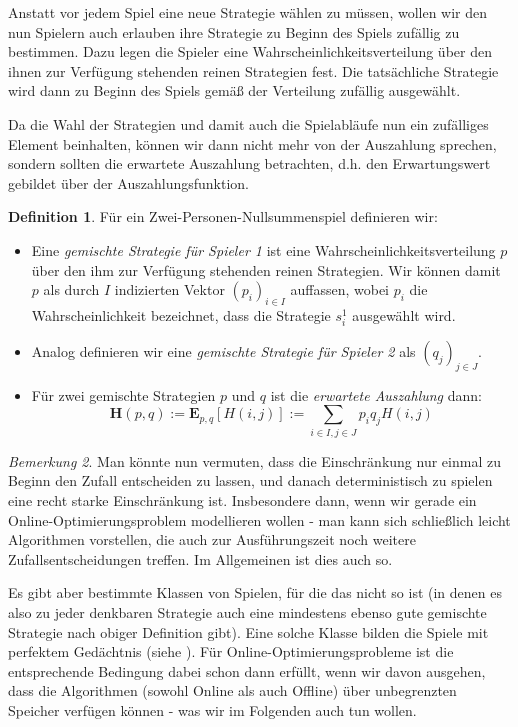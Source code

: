 \documentclass[a4paper,ngerman,12pt,bibtotoc]{scrartcl}
\theoremstyle{definition}
\newtheorem{defn}{Definition}[section]
\theoremstyle{plain}
\theoremstyle{remark}
\newtheorem{bem}[defn]{Bemerkung}
\renewcommand{\_}{\mathpunct{.}\,}
\newcommand{\?}{\,{:}\,}
\newcommand{\EE}{\mathbf{E}}
\newcommand{\Hf}{H}
\newcommand{\EH}{\boldsymbol{H}}
\newcommand{\ZPNS}{Zwei-Personen-Nullsummenspiel }
\begin{document}
	Anstatt vor jedem Spiel eine neue Strategie wählen zu müssen, wollen wir den nun Spielern auch erlauben ihre Strategie zu Beginn des Spiels zufällig zu bestimmen. Dazu legen die Spieler eine Wahrscheinlichkeitsverteilung über den ihnen zur Verfügung stehenden reinen Strategien fest. Die tatsächliche Strategie wird dann zu Beginn des Spiels gemäß der Verteilung zufällig ausgewählt.
	
	Da die Wahl der Strategien und damit auch die Spielabläufe nun ein zufälliges Element beinhalten, können wir dann nicht mehr von \glqq der Auszahlung\grqq{} sprechen, sondern sollten die erwartete Auszahlung betrachten, d.h. den Erwartungswert gebildet über der Auszahlungsfunktion.
	
	\begin{defn}Für ein \ZPNS definieren wir:	
		\begin{itemize}
			\item Eine \emph{gemischte Strategie für Spieler 1} ist eine Wahrscheinlichkeitsverteilung $p$ über den ihm zur Verfügung stehenden reinen Strategien. Wir können damit $p$ als durch $I$ indizierten Vektor $(p_i)_{i\in I}$ auffassen, wobei $p_i$ die Wahrscheinlichkeit bezeichnet, dass die Strategie $s_i^1$ ausgewählt wird.
			\item Analog definieren wir eine \emph{gemischte Strategie für Spieler 2} als $(q_j)_{j\in J}$.
			\item Für zwei gemischte Strategien $p$ und $q$ ist die \emph{erwartete Auszahlung} dann:
			\[\EH(p,q) := \EE_{p,q}\left[\Hf(i,j)\right] := \sum_{i\in I, j\in J} p_i q_j \Hf(i,j)\]
		\end{itemize}
	\end{defn}
	
	\begin{bem}\label{bem:SpielAeq}
		Man könnte nun vermuten, dass die Einschränkung nur einmal zu Beginn den Zufall entscheiden zu lassen, und danach deterministisch zu spielen eine recht starke Einschränkung ist. Insbesondere dann, wenn wir gerade ein Online-Optimierungsproblem modellieren wollen - man kann sich schließlich leicht Algorithmen vorstellen, die auch zur Ausführungszeit noch weitere Zufallsentscheidungen treffen. Im Allgemeinen ist dies auch so.
		
		Es gibt aber bestimmte Klassen von Spielen, für die das nicht so ist (in denen es also zu jeder denkbaren Strategie auch eine mindestens ebenso gute gemischte Strategie nach obiger Definition gibt). Eine solche Klasse bilden die Spiele mit perfektem Gedächtnis (siehe \cite[Theorem 6.3]{OCCA}). Für Online-Optimierungsprobleme ist die entsprechende Bedingung dabei schon dann erfüllt, wenn wir davon ausgehen, dass die Algorithmen (sowohl Online als auch Offline) über unbegrenzten Speicher verfügen können - was wir im Folgenden auch tun wollen.
	\end{bem}
	
\end{document}
